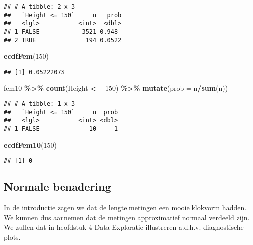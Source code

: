 \documentclass[
  12pt,dutch,coursenotes]{book}
\newenvironment{Shaded}{\begin{snugshade}}{\end{snugshade}}
\newcommand{\DataTypeTok}[1]{\textcolor[rgb]{0.13,0.29,0.53}{#1}}
\newcommand{\DecValTok}[1]{\textcolor[rgb]{0.00,0.00,0.81}{#1}}
\newcommand{\KeywordTok}[1]{\textcolor[rgb]{0.13,0.29,0.53}{\textbf{#1}}}
\newcommand{\NormalTok}[1]{#1}
\newcommand{\OperatorTok}[1]{\textcolor[rgb]{0.81,0.36,0.00}{\textbf{#1}}}
\newcommand{\StringTok}[1]{\textcolor[rgb]{0.31,0.60,0.02}{#1}}
\theoremstyle{definition}
\theoremstyle{definition}
\theoremstyle{definition}
\theoremstyle{remark}
\begin{document}
\begin{verbatim}
## # A tibble: 2 x 3
##   `Height <= 150`     n   prob
##   <lgl>           <int>  <dbl>
## 1 FALSE            3521 0.948 
## 2 TRUE              194 0.0522
\end{verbatim}

\begin{Shaded}
\begin{Highlighting}[]
\KeywordTok{ecdfFem}\NormalTok{(}\DecValTok{150}\NormalTok{)}
\end{Highlighting}
\end{Shaded}

\begin{verbatim}
## [1] 0.05222073
\end{verbatim}

\begin{Shaded}
\begin{Highlighting}[]
\NormalTok{fem10 }\OperatorTok{\%\textgreater{}\%}\StringTok{ }\KeywordTok{count}\NormalTok{(Height }\OperatorTok{\textless{}=}\StringTok{ }\DecValTok{150}\NormalTok{) }\OperatorTok{\%\textgreater{}\%}\StringTok{ }\KeywordTok{mutate}\NormalTok{(}\DataTypeTok{prob =}\NormalTok{ n}\OperatorTok{/}\KeywordTok{sum}\NormalTok{(n))}
\end{Highlighting}
\end{Shaded}

\begin{verbatim}
## # A tibble: 1 x 3
##   `Height <= 150`     n  prob
##   <lgl>           <int> <dbl>
## 1 FALSE              10     1
\end{verbatim}

\begin{Shaded}
\begin{Highlighting}[]
\KeywordTok{ecdfFem10}\NormalTok{(}\DecValTok{150}\NormalTok{)}
\end{Highlighting}
\end{Shaded}

\begin{verbatim}
## [1] 0
\end{verbatim}

\hypertarget{normale-benadering}{%
\subsection{Normale benadering}\label{normale-benadering}}

In de introductie zagen we dat de lengte metingen een mooie klokvorm hadden. We kunnen dus aannemen dat de metingen approximatief normaal verdeeld zijn. We zullen dat in hoofdstuk 4 Data Exploratie illustreren a.d.h.v. diagnostische plots.
\end{document}
